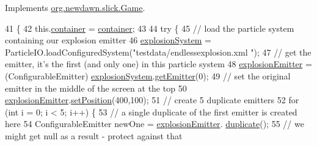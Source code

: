 Implements \mbox{\hyperlink{interfaceorg_1_1newdawn_1_1slick_1_1_game_ad2dd6affab08bb8fdb5fab0815957b7a}{org.\+newdawn.\+slick.\+Game}}.


\begin{DoxyCode}
41                                                                     \{
42         this.\mbox{\hyperlink{classorg_1_1newdawn_1_1slick_1_1tests_1_1_duplicate_emitter_test_a1bd68c36e7b1214aa3633db618e0a7c5}{container}} = \mbox{\hyperlink{classorg_1_1newdawn_1_1slick_1_1tests_1_1_duplicate_emitter_test_a1bd68c36e7b1214aa3633db618e0a7c5}{container}};
43         
44         \textcolor{keywordflow}{try} \{
45             \textcolor{comment}{// load the particle system containing our explosion emitter}
46             \mbox{\hyperlink{classorg_1_1newdawn_1_1slick_1_1tests_1_1_duplicate_emitter_test_ad51ae06362283e4a70164d3be38c3ae6}{explosionSystem}} = ParticleIO.loadConfiguredSystem(\textcolor{stringliteral}{"testdata/endlessexplosion.xml
      "});
47             \textcolor{comment}{// get the emitter, it's the first (and only one) in this particle system}
48             \mbox{\hyperlink{classorg_1_1newdawn_1_1slick_1_1tests_1_1_duplicate_emitter_test_a4dda8eb74bc929d5165d1463b5efc302}{explosionEmitter}} = (ConfigurableEmitter) 
      \mbox{\hyperlink{classorg_1_1newdawn_1_1slick_1_1tests_1_1_duplicate_emitter_test_ad51ae06362283e4a70164d3be38c3ae6}{explosionSystem}}.\mbox{\hyperlink{classorg_1_1newdawn_1_1slick_1_1particles_1_1_particle_system_a97e9702f67b46027303ab8e04bf120d3}{getEmitter}}(0);
49             \textcolor{comment}{// set the original emitter in the middle of the screen at the top}
50             \mbox{\hyperlink{classorg_1_1newdawn_1_1slick_1_1tests_1_1_duplicate_emitter_test_a4dda8eb74bc929d5165d1463b5efc302}{explosionEmitter}}.\mbox{\hyperlink{classorg_1_1newdawn_1_1slick_1_1particles_1_1_configurable_emitter_a6c1e45f4ce5a92528636c6bb085c7370}{setPosition}}(400,100);
51             \textcolor{comment}{// create 5 duplicate emitters}
52             \textcolor{keywordflow}{for} (\textcolor{keywordtype}{int} i = 0; i < 5; i++) \{
53                 \textcolor{comment}{// a single duplicate of the first emitter is created here}
54                 ConfigurableEmitter newOne = \mbox{\hyperlink{classorg_1_1newdawn_1_1slick_1_1tests_1_1_duplicate_emitter_test_a4dda8eb74bc929d5165d1463b5efc302}{explosionEmitter}}.
      \mbox{\hyperlink{classorg_1_1newdawn_1_1slick_1_1particles_1_1_configurable_emitter_a51ddc0c165c190bdc7ea2094d7be2021}{duplicate}}();
55                 \textcolor{comment}{// we might get null as a result - protect against that}

\end{DoxyCode}
